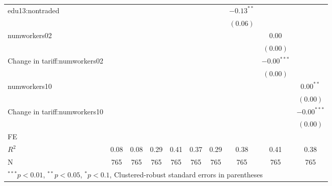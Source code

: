 \begin{tabular}{l c c c c c c c c c }
edu13:nontraded      &              &              &              &               &               &              & $-0.13^{**}$  &               &               \\
                     &              &              &              &               &               &              & $(0.06)$      &               &               \\
numworkers02         &              &              &              &               &               &              &               & $0.00$        &               \\
                     &              &              &              &               &               &              &               & $(0.00)$      &               \\
Change in tariff:numworkers02 &              &              &              &               &               &              &               & $-0.00^{***}$ &               \\
                     &              &              &              &               &               &              &               & $(0.00)$      &               \\
numworkers10         &              &              &              &               &               &              &               &               & $0.00^{**}$   \\
                     &              &              &              &               &               &              &               &               & $(0.00)$      \\
Change in tariff:numworkers10 &              &              &              &               &               &              &               &               & $-0.00^{***}$ \\
                     &              &              &              &               &               &              &               &               & $(0.00)$      \\
\hline
FE          &                &                &                &                &                &                &                &                &                \\ 
\hline
$R^2$                & 0.08         & 0.08         & 0.29         & 0.41          & 0.37          & 0.29         & 0.38          & 0.41          & 0.38          \\
N                    & 765          & 765          & 765          & 765           & 765           & 765          & 765           & 765           & 765           \\
\hline
\multicolumn{10}{l}{\scriptsize{$^{***}p<0.01$, $^{**}p<0.05$, $^*p<0.1$, Clustered-robust standard errors in parentheses}}
\end{tabular}
